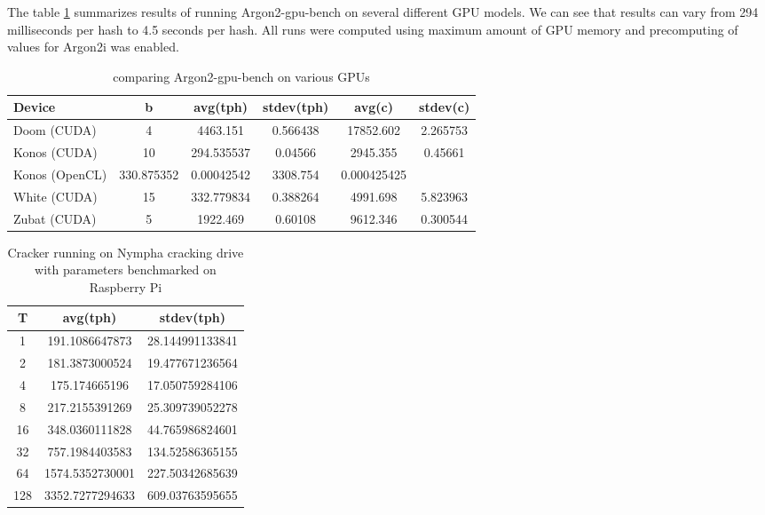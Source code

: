 \documentclass[nolof]{fithesis3}
\begin{document}
The table \ref{tab:gpus} summarizes results of running Argon2-gpu-bench on several different GPU models. We can see that results can vary from 294 milliseconds per hash to 4.5 seconds per hash. All runs were computed using maximum amount of GPU memory and precomputing of values for Argon2i was enabled.

\noindent
\begin{table}
\caption{comparing Argon2-gpu-bench on various GPUs}
\label{tab:gpus}
\begin{tabularx}{\textwidth}{| l | c | c | c | c | c |}
\hline
Device & b & avg(tph) & stdev(tph) & avg(c) & stdev(c)\\
\hline
Doom (CUDA) & 4 & 4463.151 & 0.566438 & 17852.602 & 2.265753\\
\hline
Konos (CUDA) & 10 & 294.535537 & 0.04566 & 2945.355 & 0.45661 \\
\hline
Konos (OpenCL) & 330.875352 & 0.00042542 & 3308.754 & 0.000425425\\ 
\hline
White  (CUDA) & 15 & 332.779834 & 0.388264 & 4991.698 & 5.823963\\
\hline
Zubat (CUDA) & 5 & 1922.469 & 0.60108 & 9612.346 &0.300544\\
\hline
\end{tabularx}
\end{table}


\noindent
\begin{table}
\caption{Cracker running on Nympha cracking drive with parameters benchmarked on Raspberry Pi}
\label{tab:nymphacrackerrpi}
\begin{tabularx}{\textwidth}{| c | c | c |}
\hline
T & avg(tph) & stdev(tph)\\
\hline
1 & 191.1086647873 & 28.144991133841\\
\hline
2 & 181.3873000524 & 19.477671236564\\
\hline
4 & 175.174665196 & 17.050759284106\\
\hline
8 & 217.2155391269 & 25.309739052278\\
\hline
16 & 348.0360111828 & 44.765986824601\\
\hline
32 & 757.1984403583 & 134.52586365155\\
\hline
64 & 1574.5352730001 & 227.50342685639\\
\hline
128 & 3352.7277294633 & 609.03763595655\\
\hline
\end{tabularx}
\end{table}
\end{document}
